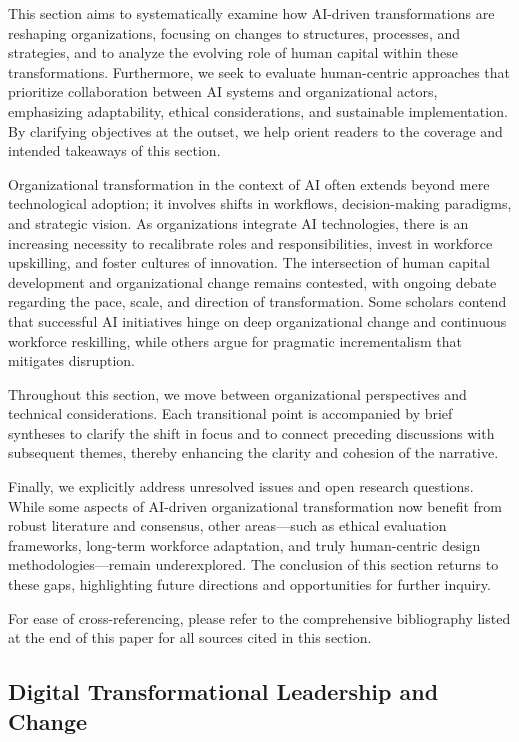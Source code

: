 \documentclass[sigconf]{acmart}
\begin{document}
This section aims to systematically examine how AI-driven transformations are reshaping organizations, focusing on changes to structures, processes, and strategies, and to analyze the evolving role of human capital within these transformations. Furthermore, we seek to evaluate human-centric approaches that prioritize collaboration between AI systems and organizational actors, emphasizing adaptability, ethical considerations, and sustainable implementation. By clarifying objectives at the outset, we help orient readers to the coverage and intended takeaways of this section.

Organizational transformation in the context of AI often extends beyond mere technological adoption; it involves shifts in workflows, decision-making paradigms, and strategic vision. As organizations integrate AI technologies, there is an increasing necessity to recalibrate roles and responsibilities, invest in workforce upskilling, and foster cultures of innovation. The intersection of human capital development and organizational change remains contested, with ongoing debate regarding the pace, scale, and direction of transformation. Some scholars contend that successful AI initiatives hinge on deep organizational change and continuous workforce reskilling, while others argue for pragmatic incrementalism that mitigates disruption.

Throughout this section, we move between organizational perspectives and technical considerations. Each transitional point is accompanied by brief syntheses to clarify the shift in focus and to connect preceding discussions with subsequent themes, thereby enhancing the clarity and cohesion of the narrative.

Finally, we explicitly address unresolved issues and open research questions. While some aspects of AI-driven organizational transformation now benefit from robust literature and consensus, other areas—such as ethical evaluation frameworks, long-term workforce adaptation, and truly human-centric design methodologies—remain underexplored. The conclusion of this section returns to these gaps, highlighting future directions and opportunities for further inquiry.

For ease of cross-referencing, please refer to the comprehensive bibliography listed at the end of this paper for all sources cited in this section.

\subsection{Digital Transformational Leadership and Change}
\end{document}
